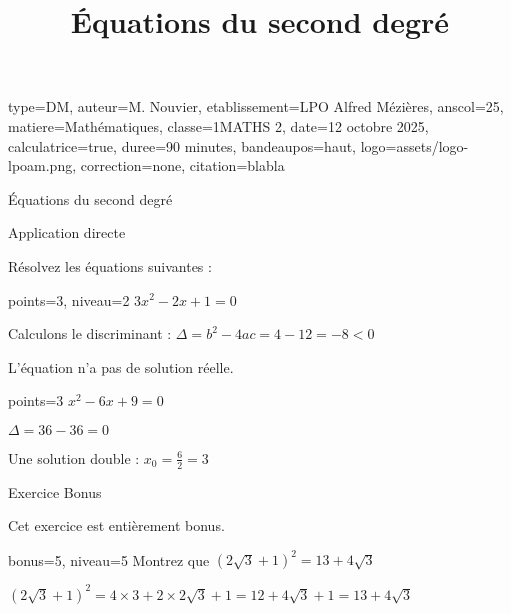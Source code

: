 \documentclass[theme=vert]{nfdevoirs}
\title{Équations du second degré}
\begin{document}
\begin{devoir}{
        type=DM,
        auteur={M. Nouvier},
        etablissement={LPO Alfred Mézières},
        anscol=25,
        matiere={Mathématiques},
        classe={1MATHS 2},
        date={12 octobre 2025},
        calculatrice=true,
        duree={90 minutes},
        bandeaupos=haut,
        logo={assets/logo-lpoam.png},
        correction=none,
        citation={blabla}
    }

    \begin{partie}{Équations du second degré}

        \begin{exercice}{Application directe}

            Résolvez les équations suivantes :

            \begin{question}{points=3, niveau=2}
                $3x^2 - 2x + 1 = 0$
            \end{question}

            \begin{correction}
                Calculons le discriminant : $\Delta = b^2 - 4ac = 4 - 12 = -8 < 0$

                L'équation n'a pas de solution réelle.
            \end{correction}

            \begin{question}{points=3}
                $x^2 - 6x + 9 = 0$
            \end{question}

            \begin{correction}
                $\Delta = 36 - 36 = 0$

                Une solution double : $x_0 = \frac{6}{2} = 3$
            \end{correction}

        \end{exercice}

        \begin{exercice}{Exercice Bonus}

            Cet exercice est entièrement bonus.

            \begin{question}{bonus=5, niveau=5}
                Montrez que $(2\sqrt{3} + 1)^2 = 13 + 4\sqrt{3}$
            \end{question}

            \begin{correction}
                $(2\sqrt{3} + 1)^2 = 4 \times 3 + 2 \times 2\sqrt{3} + 1 = 12 + 4\sqrt{3} + 1 = 13 + 4\sqrt{3}$
            \end{correction}

        \end{exercice}

    \end{partie}

\end{devoir}
\end{document}
